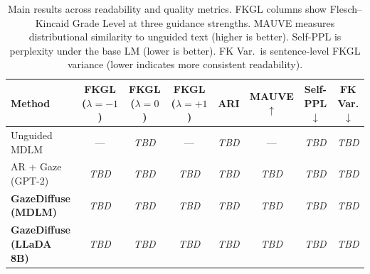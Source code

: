 
\begin{table}[t]
\centering
\small
\begin{tabular}{@{}lccccccc@{}}
\toprule
\textbf{Method}
  & \textbf{FKGL} ($\lambda{=}{-}1$)
  & \textbf{FKGL} ($\lambda{=}0$)
  & \textbf{FKGL} ($\lambda{=}{+}1$)
  & \textbf{ARI}
  & \textbf{MAUVE} $\uparrow$
  & \textbf{Self-PPL} $\downarrow$
  & \textbf{FK Var.} $\downarrow$ \\
\midrule
Unguided MDLM
  & ---
  & \textit{TBD}
  & ---
  & \textit{TBD}
  & ---
  & \textit{TBD}
  & \textit{TBD} \\
AR + Gaze (GPT-2)
  & \textit{TBD}
  & \textit{TBD}
  & \textit{TBD}
  & \textit{TBD}
  & \textit{TBD}
  & \textit{TBD}
  & \textit{TBD} \\
\midrule
\textbf{GazeDiffuse (MDLM)}
  & \textit{TBD}
  & \textit{TBD}
  & \textit{TBD}
  & \textit{TBD}
  & \textit{TBD}
  & \textit{TBD}
  & \textit{TBD} \\
\textbf{GazeDiffuse (LLaDA 8B)}
  & \textit{TBD}
  & \textit{TBD}
  & \textit{TBD}
  & \textit{TBD}
  & \textit{TBD}
  & \textit{TBD}
  & \textit{TBD} \\
\bottomrule
\end{tabular}
\caption{
  Main results across readability and quality metrics.
  FKGL columns show Flesch--Kincaid Grade Level at three guidance strengths.
  MAUVE measures distributional similarity to unguided text (higher is better).
  Self-PPL is perplexity under the base LM (lower is better).
  FK Var.\ is sentence-level FKGL variance (lower indicates more consistent readability).
}
\label{tab:results}
\end{table}
